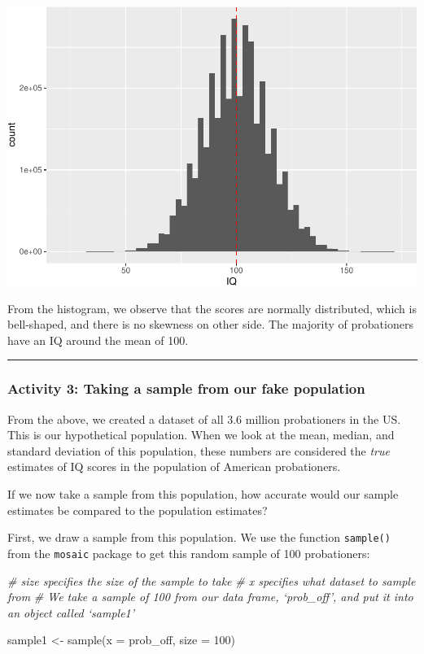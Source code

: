 \documentclass[
]{book}
\newenvironment{Shaded}{\begin{snugshade}}{\end{snugshade}}
\newcommand{\AttributeTok}[1]{\textcolor[rgb]{0.77,0.63,0.00}{#1}}
\newcommand{\CommentTok}[1]{\textcolor[rgb]{0.56,0.35,0.01}{\textit{#1}}}
\newcommand{\DecValTok}[1]{\textcolor[rgb]{0.00,0.00,0.81}{#1}}
\newcommand{\FunctionTok}[1]{\textcolor[rgb]{0.00,0.00,0.00}{#1}}
\newcommand{\NormalTok}[1]{#1}
\newcommand{\OtherTok}[1]{\textcolor[rgb]{0.56,0.35,0.01}{#1}}
\begin{document}
\includegraphics{05-inferential-statistics_files/figure-latex/unnamed-chunk-10-1.pdf}

From the histogram, we observe that the scores are normally distributed, which is bell-shaped, and there is no skewness on other side. The majority of probationers have an IQ around the mean of 100.

\begin{center}\rule{0.5\linewidth}{0.5pt}\end{center}

\hypertarget{activity-3-taking-a-sample-from-our-fake-population}{%
\subsubsection{Activity 3: Taking a sample from our fake population}\label{activity-3-taking-a-sample-from-our-fake-population}}

From the above, we created a dataset of all 3.6 million probationers in the US. This is our hypothetical population. When we look at the mean, median, and standard deviation of this population, these numbers are considered the \emph{true} estimates of IQ scores in the population of American probationers.

If we now take a sample from this population, how accurate would our sample estimates be compared to the population estimates?

First, we draw a sample from this population. We use the function \texttt{sample()} from the \texttt{mosaic} package to get this random sample of 100 probationers:

\begin{Shaded}
\begin{Highlighting}[]
\CommentTok{\# \textquotesingle{}size\textquotesingle{} specifies the size of the sample to take}
\CommentTok{\# \textquotesingle{}x\textquotesingle{} specifies what dataset to sample from}
\CommentTok{\# We take a sample of 100 from our data frame, ‘prob\_off’, and put it into an object called ‘sample1’}

\NormalTok{sample1 }\OtherTok{\textless{}{-}} \FunctionTok{sample}\NormalTok{(}\AttributeTok{x =}\NormalTok{ prob\_off, }\AttributeTok{size =} \DecValTok{100}\NormalTok{)}
\end{Highlighting}
\end{Shaded}
\end{document}
